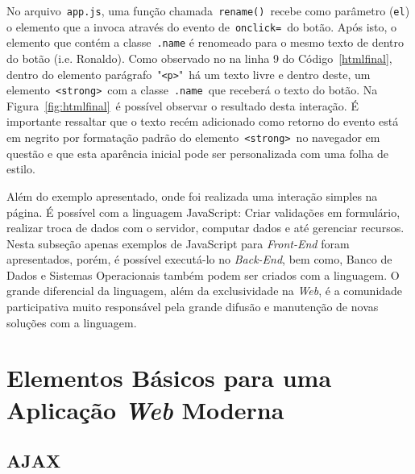 No arquivo~\texttt{app.js}, uma função chamada~\texttt{rename()}~recebe como parâmetro (\texttt{el}) o elemento que a invoca através do evento de~\texttt{onclick=}~do botão. Após isto, o elemento que contém a classe~\texttt{.name} é renomeado para o mesmo texto de dentro do botão (i.e. Ronaldo). Como observado no na linha 9 do Código~\ref{htmlfinal}, dentro do elemento parágrafo~"\texttt{<p>}"~há um texto livre e dentro deste, um elemento~\texttt{<strong>}~com a classe~\texttt{.name}~que receberá o texto do botão. Na Figura~\ref{fig:htmlfinal}~é possível observar o resultado desta interação. É importante ressaltar que o texto recém adicionado como retorno do evento está em negrito por formatação padrão do elemento~\texttt{<strong>}~no navegador em questão e que esta aparência inicial pode ser personalizada com uma folha de estilo.

\begin{figure}[th]
\end{figure}

Além do exemplo apresentado, onde foi realizada uma interação simples na página. É possível com a linguagem JavaScript: Criar validações em formulário, realizar troca de dados com o servidor, computar dados e até gerenciar recursos. Nesta subseção apenas exemplos de JavaScript para \textit{Front-End} foram apresentados, porém, é possível executá-lo no \textit{Back-End}, bem como, Banco de Dados e Sistemas Operacionais também podem ser criados com a linguagem. O grande diferencial da linguagem, além da exclusividade na \textit{Web}, é a comunidade participativa muito responsável pela grande difusão e manutenção de novas soluções com a linguagem.
%
%
%
%
%
%
%
%
%
\section{Elementos Básicos para uma Aplicação \textit{Web} Moderna}
\label{ElementosWeb}

\subsection{AJAX}
\label{SubAJAX}

